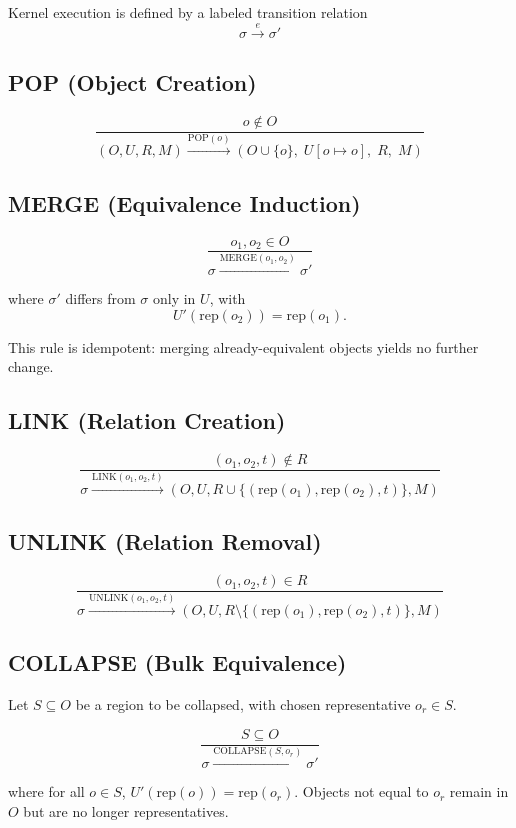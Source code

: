 \documentclass[11pt]{article}
\begin{document}
Kernel execution is defined by a labeled transition relation
\[
\sigma \xrightarrow{e} \sigma'
\]

\subsection{POP (Object Creation)}

\[
\dfrac{ o \notin O }{ (O, U, R, M) \xrightarrow{\mathrm{POP}(o)} (O \cup \{o\},\; U[o \mapsto o],\; R,\; M) }
\]

\subsection{MERGE (Equivalence Induction)}

\[
\dfrac{ o_1, o_2 \in O }{ \sigma \xrightarrow{\mathrm{MERGE}(o_1,o_2)} \sigma' }
\]

where $\sigma'$ differs from $\sigma$ only in $U$, with
\[
U'(\mathrm{rep}(o_2)) = \mathrm{rep}(o_1).
\]

This rule is idempotent: merging already-equivalent objects yields no further change.

\subsection{LINK (Relation Creation)}

\[
\dfrac{ (o_1,o_2,t) \notin R }{ \sigma \xrightarrow{\mathrm{LINK}(o_1,o_2,t)} (O, U, R \cup \{(\mathrm{rep}(o_1),\mathrm{rep}(o_2),t)\}, M) }
\]

\subsection{UNLINK (Relation Removal)}

\[
\dfrac{ (o_1,o_2,t) \in R }{ \sigma \xrightarrow{\mathrm{UNLINK}(o_1,o_2,t)} (O, U, R \setminus \{(\mathrm{rep}(o_1),\mathrm{rep}(o_2),t)\}, M) }
\]

\subsection{COLLAPSE (Bulk Equivalence)}

Let $S \subseteq O$ be a region to be collapsed, with chosen representative $o_r \in S$.

\[
\dfrac{ S \subseteq O }{ \sigma \xrightarrow{\mathrm{COLLAPSE}(S,o_r)} \sigma' }
\]

where for all $o \in S$, $U'(\mathrm{rep}(o)) = \mathrm{rep}(o_r)$. Objects not equal to $o_r$ remain in $O$ but are no longer representatives.
\end{document}
